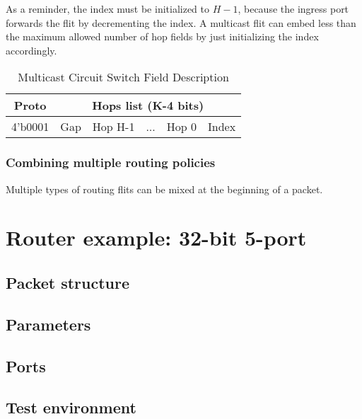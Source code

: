 As a reminder, the index must be initialized to $H-1$, because the ingress port forwards the flit by decrementing the
index. A multicast flit can embed less than the maximum allowed number of hop fields by just initializing the index
accordingly.

\begin{table}[h]
  \centering
  \begin{tabular}{c | c | c | c | c | c}
    \toprule
    \hline
    \textbf{Proto} & \multicolumn{5}{c}{\textbf{Hops list (K-4 bits)}} \\
    \hline\hline
    4'b0001 & Gap & Hop H-1 & ... & Hop 0 & Index \\
    \hline
    \bottomrule
  \end{tabular}
  \caption{\label{multicast_circuit_switch_field} Multicast Circuit Switch Field Description}
\end{table}

\subsubsection{Combining multiple routing policies}

Multiple types of routing flits can be mixed at the beginning of a packet.

\section{Router example: 32-bit 5-port}

\subsection{Packet structure}

\subsection{Parameters}

\subsection{Ports}

\subsection{Test environment}
